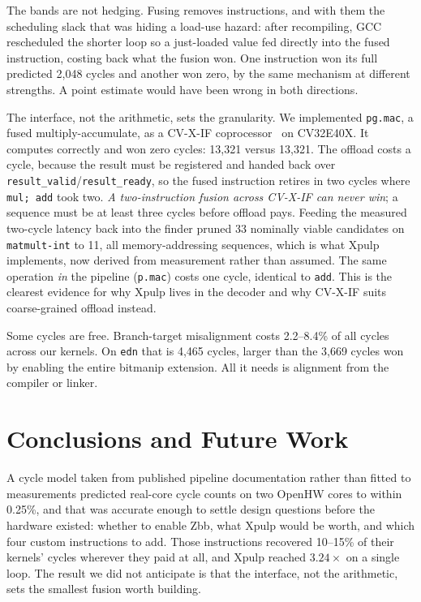 \documentclass[conference,10pt]{IEEEtran}
\begin{document}
The bands are not hedging. Fusing removes instructions, and with them the
scheduling slack that was hiding a load-use hazard: after recompiling, GCC
rescheduled the shorter loop so a just-loaded value fed directly into the fused
instruction, costing back what the fusion won. One instruction won its full
predicted 2{,}048 cycles and another won zero, by the same mechanism at
different strengths. A point estimate would have been wrong in both directions.

The interface, not the arithmetic, sets the granularity. We
implemented \texttt{pg.mac}, a fused multiply-accumulate, as a CV-X-IF
coprocessor~\cite{cvxif} on CV32E40X. It computes correctly and won
zero cycles: 13{,}321 versus 13{,}321. The offload costs a cycle,
because the result must be registered and handed back over
\texttt{result\_valid}/\texttt{result\_ready}, so the fused instruction retires
in two cycles where \texttt{mul; add} took two. \emph{A two-instruction fusion
across CV-X-IF can never win}; a sequence must be at least three cycles before
offload pays. Feeding the measured two-cycle latency back into the finder pruned
33 nominally viable candidates on \texttt{matmult-int} to 11, all
memory-addressing sequences, which is what Xpulp implements, now derived from
measurement rather than assumed. The same operation \emph{in} the pipeline
(\texttt{p.mac}) costs one cycle, identical to \texttt{add}. This is the
clearest evidence for why Xpulp lives in the decoder and why CV-X-IF suits
coarse-grained offload instead.

Some cycles are free. Branch-target misalignment costs
2.2--8.4\% of all cycles across our kernels. On \texttt{edn} that is 4{,}465
cycles, larger than the 3{,}669 cycles won by enabling the entire bitmanip
extension. All it needs is alignment from the compiler or linker.

\section{Conclusions and Future Work}

A cycle model taken from published pipeline documentation rather than fitted to
measurements predicted real-core cycle counts on two OpenHW cores to within
0.25\%, and that was accurate enough to settle design questions before the
hardware existed: whether to enable Zbb, what Xpulp would be worth, and which
four custom instructions to add. Those instructions recovered 10--15\% of their
kernels' cycles wherever they paid at all, and Xpulp reached $3.24\times$ on a
single loop. The result we did not anticipate is that the interface, not the
arithmetic, sets the smallest fusion worth building.
\end{document}
